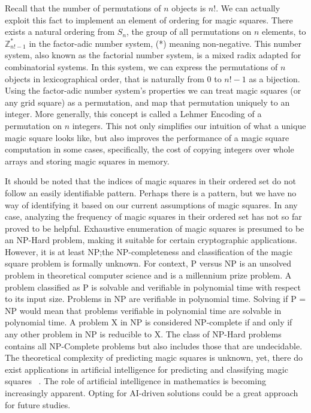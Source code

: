 \documentclass{rhumj_new}
\begin{document}
Recall that the number of permutations of $n$ objects is $n$!. We can actually exploit this
fact to implement an element of ordering for magic squares. There exists a natural ordering from
$S_n$, the group of all permutations on $n$ elements, to $\mathbb{Z}^{*}_{n!-1}$  in the
factor-adic number system, (*) meaning non-negative. This number system, also known as the
factorial number system, is a mixed radix adapted for combinatorial systems. In this system, we can
express the permutations of $n$ objects in lexicographical order, that is naturally from $0$ to
$n!-1$ as a bijection. Using the factor-adic number system's properties we can treat magic squares
(or any grid square) as a permutation, and map that permutation uniquely to an integer. More
generally, this concept is called a Lehmer Encoding of a permutation on $n$ integers\cite{Lehmer}. This
not only simplifies our intuition of what a unique magic square looks like, but also improves the
performance of a magic square computation in some cases, specifically, the cost of copying integers
over whole arrays and storing magic squares in memory.

It should be noted that the indices of magic squares in their ordered set do not follow an
easily identifiable pattern. Perhaps there is a pattern, but we have no way of identifying it based
on our current assumptions of magic squares. In any case, analyzing the frequency of magic squares
in their ordered set has not so far proved to be helpful. Exhaustive enumeration of magic squares
is presumed to be an NP-Hard problem, making it suitable for certain cryptographic applications.
However, it is at least NP;\@ the NP-completeness and classification of the magic square problem is
formally unknown. For context, P versus NP is an unsolved problem in theoretical computer science
and is a millennium prize problem. A problem classified as P is solvable and verifiable in
polynomial time with respect to its input size. Problems in NP are verifiable in polynomial time.
Solving if P = NP would mean that problems verifiable in polynomial time are solvable in polynomial
time. A problem X in NP is considered NP-complete if and only if any other problem in NP is
reducible to X. The class of NP-Hard problems contains all NP-Complete problems but also includes
those that are undecidable. The theoretical complexity of predicting magic squares is unknown, yet,
there do exist applications in artificial intelligence for predicting and classifying magic squares
~\cite{Weed}. The role of artificial intelligence in mathematics is becoming increasingly apparent.
Opting for AI-driven solutions could be a great approach for future studies.
\end{document}
